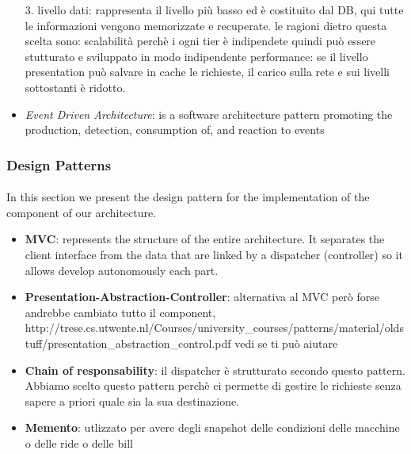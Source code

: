 \documentclass[english]{article}
\begin{document}
\begin{itemize}
{                                        3. livello dati: rappresenta il livello più basso ed è costituito dal DB, qui tutte le informazioni vengono memorizzate e recuperate.
                                        le ragioni dietro questa scelta sono: scalabilità perchè i ogni tier è indipendete quindi può essere stutturato e sviluppato in modo indipendente
                                                                              performance: se il livello presentation può salvare in cache le richieste, il carico sulla rete e sui livelli sottostanti è ridotto.}
\item{\textit{Event Driven Architecture}: is a software architecture pattern promoting the production, detection, consumption of, and reaction to events}
\end{itemize}


\subsubsection{Design Patterns}

\paragraph{}
In this section we present the design pattern for the implementation of the component of our architecture.

\begin{itemize}
	\item{\textbf{MVC}: represents the structure of the entire architecture. It separates the client interface from the data that are linked by a dispatcher (controller) so it allows develop autonomously each part.}
	\item{\textbf{Presentation-Abstraction-Controller}: alternativa al MVC però forse andrebbe cambiato tutto il component, http://trese.cs.utwente.nl/Courses/university\_courses/patterns/material/oldstuff/presentation\_abstraction\_control.pdf vedi se ti può aiutare}
	\item{\textbf{Chain of responsability}: il dispatcher è strutturato secondo questo pattern. Abbiamo scelto questo pattern perchè ci permette di gestire le richieste senza sapere a priori quale sia la sua destinazione.}
	\item{\textbf{Memento}: utlizzato per avere degli snapshot delle condizioni delle macchine o delle ride o delle bill }
\end{itemize}
\end{document}
